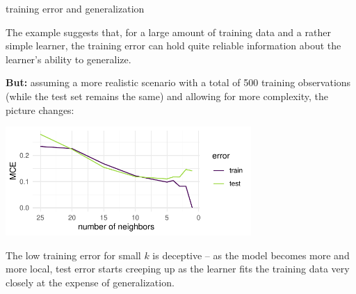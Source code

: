 \documentclass[11pt,compress,t,notes=noshow, xcolor=table]{beamer}
\begin{document}
\begin{vbframe}{training error and generalization}
\framebreak


\small

The example suggests that, for a large amount of training data and a rather
simple learner, the training error can hold quite reliable information about 
the learner's ability to generalize.

\vfill

\textbf{But:} assuming a more realistic scenario with a total of 500 training
observations (while the test set remains the same) and allowing for more 
complexity, the picture changes:

\vfill

\begin{center}
\includegraphics[width = 0.7\textwidth]{figure/eval_delta_train_test_overfit}
\end{center}

\vfill

The low training error for small $k$ is deceptive -- as the model becomes more 
and more local, test error starts creeping up as the learner fits the 
training data very closely at the expense of generalization.

\end{vbframe}


\endlecture
\end{document}
